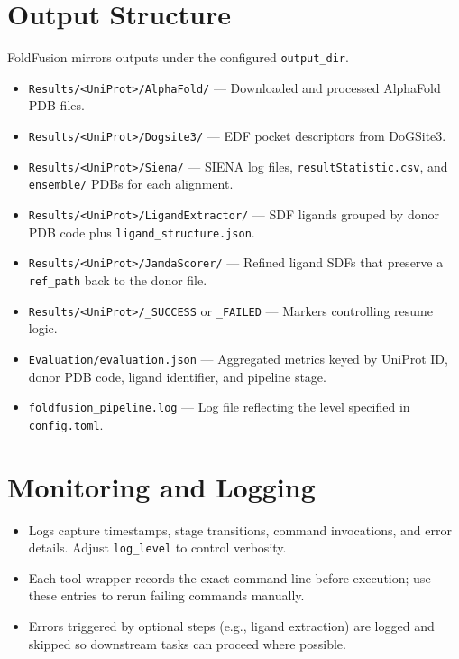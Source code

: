 \documentclass[11pt]{article}
\begin{document}
\section{Output Structure}
FoldFusion mirrors outputs under the configured \texttt{output\_dir}.
\begin{itemize}[noitemsep]
      \item \texttt{Results/\textless UniProt\textgreater/AlphaFold/} --- Downloaded
            and processed AlphaFold PDB files.
      \item \texttt{Results/\textless UniProt\textgreater/Dogsite3/} --- EDF pocket
            descriptors from DoGSite3.
      \item \texttt{Results/\textless UniProt\textgreater/Siena/} --- SIENA log
            files, \texttt{resultStatistic.csv}, and \texttt{ensemble/} PDBs for
            each alignment.
      \item \texttt{Results/\textless UniProt\textgreater/LigandExtractor/} --- SDF
            ligands grouped by donor PDB code plus \texttt{ligand\_structure.json}.
      \item \texttt{Results/\textless UniProt\textgreater/JamdaScorer/} --- Refined
            ligand SDFs that preserve a \texttt{ref\_path} back to the donor file.
      \item \texttt{Results/\textless UniProt\textgreater/\_SUCCESS} or
            \texttt{\_FAILED} --- Markers controlling resume logic.
      \item \texttt{Evaluation/evaluation.json} --- Aggregated metrics keyed by
            UniProt ID, donor PDB code, ligand identifier, and pipeline stage.
      \item \texttt{foldfusion\_pipeline.log} --- Log file reflecting the level
            specified in \texttt{config.toml}.
\end{itemize}

\section{Monitoring and Logging}
\begin{itemize}[noitemsep]
      \item Logs capture timestamps, stage transitions, command invocations, and
            error details. Adjust \texttt{log\_level} to control verbosity.
      \item Each tool wrapper records the exact command line before execution; use
            these entries to rerun failing commands manually.
      \item Errors triggered by optional steps (e.g., ligand extraction) are logged
            and skipped so downstream tasks can proceed where possible.
\end{itemize}
\end{document}
